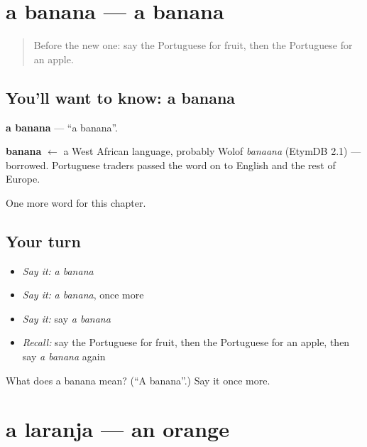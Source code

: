 \section[a banana]{a banana — a banana}

\label{lesson:PT-C45-banana}



\begin{quote}
Before the new one: say the Portuguese for fruit, then the Portuguese for an apple.
\end{quote}

\subsection*{You'll want to know: a banana}
\textbf{a banana} — \textquotedblleft{}a banana\textquotedblright{}.

\begin{cousinweb}
\textbf{banana} $\leftarrow$ a West African language, probably Wolof \emph{banaana} (EtymDB 2.1) — borrowed. Portuguese traders passed the word on to English and the rest of Europe.
\end{cousinweb}

\begin{grammarlens}[title={What you've built}]
One more word for this chapter.
\end{grammarlens}

\subsection*{Your turn}
\begin{itemize}
\raggedright
  \item \emph{Say it:} \emph{a banana}
  \item \emph{Say it:} \emph{a banana}, once more
  \item \emph{Say it:} say \emph{a banana}
  \item \emph{Recall:} say the Portuguese for fruit, then the Portuguese for an apple, then say \emph{a banana} again
\end{itemize}

\begin{tcolorbox}[breakable,colback=teal!4,colframe=teal!35!black,title={Before you move on}]
What does a banana mean? (\textquotedblleft{}A banana\textquotedblright{}.) Say it once more.
\end{tcolorbox}
\section[a laranja]{a laranja — an orange}


